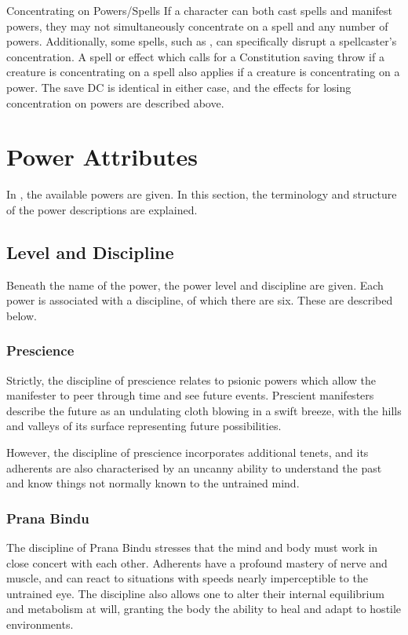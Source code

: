\begin{DndSidebar}[float=htbp]{Concentrating on Powers/Spells}
    If a character
    can both cast spells and manifest powers,
    they may not simultaneously concentrate on a spell
    and any number of powers.
    Additionally, some spells, such as ,
    can specifically disrupt a spellcaster's concentration.
    A spell or effect which calls for a Constitution saving throw
    if a creature is concentrating on a spell
    also applies if a creature is concentrating on a power.
    The save DC is identical in either case,
    and the effects for losing concentration on powers
    are described above.
\end{DndSidebar}

\section{Power Attributes}
\label{sec:power_attributes}
In ,
the available powers are given.
In this section,
the terminology and structure of the power descriptions are explained.

\subsection{Level and Discipline}
Beneath the name of the power,
the power level and discipline are given.
Each power is associated with a discipline,
of which there are six.
These are described below.

\subsubsection{Prescience}
Strictly, the discipline of prescience relates to psionic powers
which allow the manifester to peer through time and see future events.
Prescient manifesters describe the future as
an undulating cloth blowing in a swift breeze,
with the hills and valleys of its surface representing
future possibilities. 

However,
the discipline of prescience incorporates additional tenets,
and its adherents are also characterised by an uncanny ability to
understand the past and know things not normally known to
the untrained mind.

\subsubsection{Prana Bindu}
The discipline of Prana Bindu stresses that the mind and body
must work in close concert with each other.
Adherents have a profound mastery of nerve and muscle,
and can react to situations with speeds nearly imperceptible
to the untrained eye.
The discipline also allows one to alter their internal equilibrium
and metabolism at will,
granting the body the ability to heal and adapt to hostile environments.

